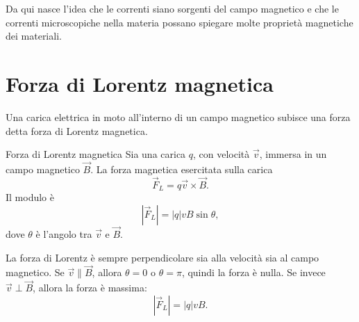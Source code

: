 \documentclass[a4paper]{article}
\begin{document}
\begin{center}
\end{center}

\begin{center}
\end{center}

Da qui nasce l'idea che le correnti siano sorgenti del campo magnetico e che le correnti microscopiche nella materia possano spiegare molte proprietà magnetiche dei materiali.

\section{Forza di Lorentz magnetica}

Una carica elettrica in moto all'interno di un campo magnetico subisce una forza detta forza di Lorentz magnetica.

\begin{snippetdefinition}{Forza di Lorentz magnetica}
    Sia una carica \(q\), con velocità \(\vec{v}\), immersa in un campo magnetico \(\vec{B}\). La forza magnetica esercitata sulla carica
    \[
        \vec{F}_L=q\vec{v}\times\vec{B}.
    \]
    Il modulo è
    \[
        |\vec{F}_L|=|q|vB\sin\theta,
    \]
    dove \(\theta\) è l'angolo tra \(\vec{v}\) e \(\vec{B}\).
\end{snippetdefinition}

La forza di Lorentz è sempre perpendicolare sia alla velocità sia al campo magnetico. Se \(\vec{v}\parallel\vec{B}\), allora \(\theta=0\) o \(\theta=\pi\), quindi la forza è nulla. Se invece \(\vec{v}\perp\vec{B}\), allora la forza è massima:
\[
    |\vec{F}_L|=|q|vB.
\]
\end{document}
